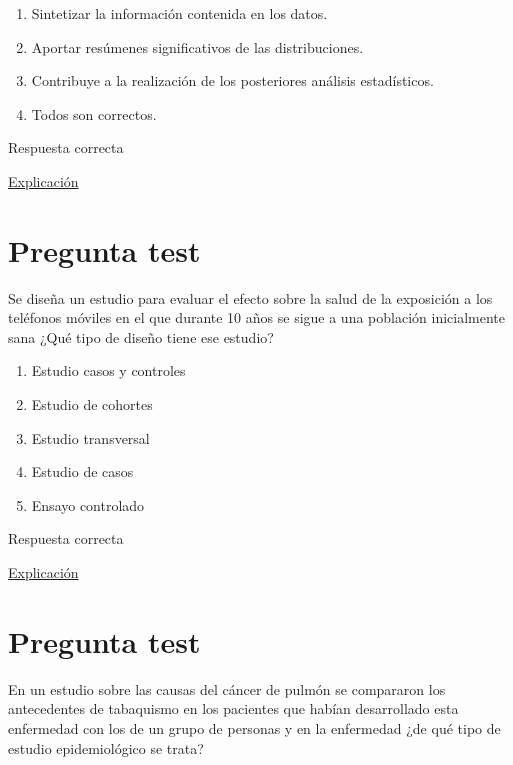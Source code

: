 \documentclass[
]{book}
\providecommand{\tightlist}{%
  \setlength{\itemsep}{0pt}\setlength{\parskip}{0pt}}
\begin{document}
\begin{enumerate}
\def\labelenumi{\alph{enumi})}
\tightlist
\item
  Sintetizar la información contenida en los datos.
\item
  Aportar resúmenes significativos de las distribuciones.
\item
  Contribuye a la realización de los posteriores análisis estadísticos.
\item
  Todos son correctos.
\end{enumerate}

Respuesta correcta

\href{https://1fjmanzano.github.io/bioestadistica/an\%C3\%A1lisis-exploratorio-de-datos.html}{Explicación}

\hypertarget{pregunta-test-38}{%
\section{Pregunta test}\label{pregunta-test-38}}

Se diseña un estudio para evaluar el efecto sobre la salud de la exposición a los teléfonos móviles en el que durante 10 años se sigue a una población inicialmente sana ¿Qué tipo de diseño tiene ese estudio?

\begin{enumerate}
\def\labelenumi{\alph{enumi})}
\tightlist
\item
  Estudio casos y controles
\item
  Estudio de cohortes
\item
  Estudio transversal
\item
  Estudio de casos
\item
  Ensayo controlado
\end{enumerate}

Respuesta correcta

\href{https://es.wikipedia.org/wiki/Estudio_de_cohorte}{Explicación}

\hypertarget{pregunta-test-39}{%
\section{Pregunta test}\label{pregunta-test-39}}

En un estudio sobre las causas del cáncer de pulmón se compararon los antecedentes de tabaquismo en los pacientes que habían desarrollado esta enfermedad con los de un grupo de personas y en la enfermedad ¿de qué tipo de estudio epidemiológico se trata?
\end{document}
